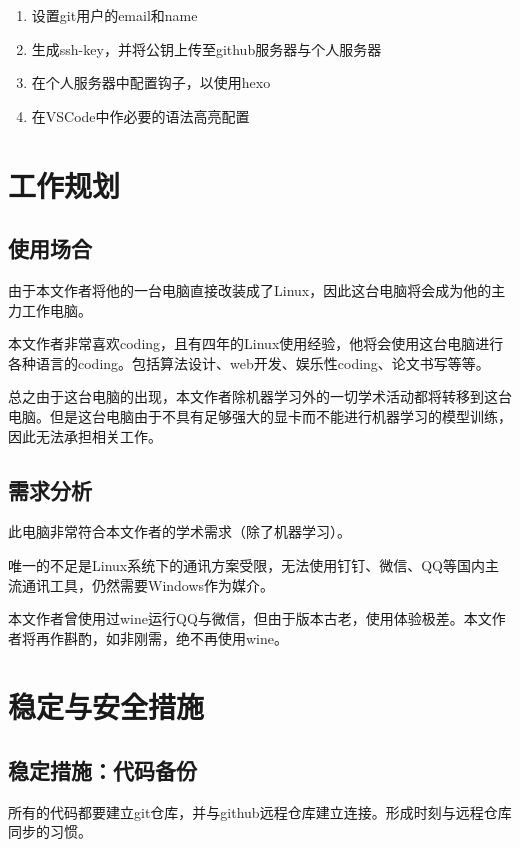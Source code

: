 \documentclass[UTF8]{ctexart}
\begin{document}
\begin{enumerate}[itemindent=2em]
    \setlength{\itemsep}{-5pt}
    \item 设置git用户的email和name
    \item 生成ssh-key，并将公钥上传至github服务器与个人服务器
    \item 在个人服务器中配置钩子，以使用hexo
    \item 在VSCode中作必要的语法高亮配置
\end{enumerate}

\section{工作规划}

\subsection{使用场合}

由于本文作者将他的一台电脑直接改装成了Linux，因此这台电脑将会成为他的主力工作电脑。

本文作者非常喜欢coding，且有四年的Linux使用经验，他将会使用这台电脑进行各种语言的coding。包括算法设计、web开发、娱乐性coding、论文书写等等。

总之由于这台电脑的出现，本文作者除机器学习外的一切学术活动都将转移到这台电脑。但是这台电脑由于不具有足够强大的显卡而不能进行机器学习的模型训练，因此无法承担相关工作。

\subsection{需求分析}

此电脑非常符合本文作者的学术需求（除了机器学习）。

唯一的不足是Linux系统下的通讯方案受限，无法使用钉钉、微信、QQ等国内主流通讯工具，仍然需要Windows作为媒介。

本文作者曾使用过wine运行QQ与微信，但由于版本古老，使用体验极差。本文作者将再作斟酌，如非刚需，绝不再使用wine。

\section{稳定与安全措施}

\subsection{稳定措施：代码备份}

所有的代码都要建立git仓库，并与github远程仓库建立连接。形成时刻与远程仓库同步的习惯。
\end{document}
